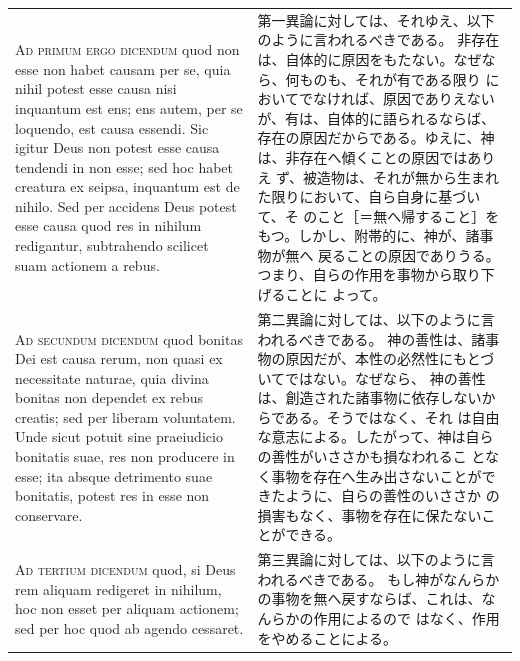 \documentclass[paper=a4paper,fontsize=10pt,jafontsize=9pt,titlepage]{jlreq}
\begin{document}
\begin{longtable}{p{21em}p{21em}}
\\


{\scshape Ad primum ergo dicendum} quod non esse non
habet causam per se, quia nihil potest esse causa nisi inquantum est
ens; ens autem, per se loquendo, est causa essendi. Sic igitur Deus non
potest esse causa tendendi in non esse; sed hoc habet creatura ex
seipsa, inquantum est de nihilo. Sed per accidens Deus potest esse causa
quod res in nihilum redigantur, subtrahendo scilicet suam actionem a
rebus.

&


第一異論に対しては、それゆえ、以下のように言われるべきである。
非存在は、自体的に原因をもたない。なぜなら、何ものも、それが有である限り
 においてでなければ、原因でありえないが、有は、自体的に語られるならば、
 存在の原因だからである。ゆえに、神は、非存在へ傾くことの原因ではありえ
 ず、被造物は、それが無から生まれた限りにおいて、自ら自身に基づいて、そ
 のこと［＝無へ帰すること］をもつ。しかし、附帯的に、神が、諸事物が無へ
 戻ることの原因でありうる。つまり、自らの作用を事物から取り下げることに
 よって。

\\


{\scshape Ad secundum dicendum} quod bonitas Dei est
causa rerum, non quasi ex necessitate naturae, quia divina bonitas non
dependet ex rebus creatis; sed per liberam voluntatem. Unde sicut potuit
sine praeiudicio bonitatis suae, res non producere in esse; ita absque
detrimento suae bonitatis, potest res in esse non conservare.

&

第二異論に対しては、以下のように言われるべきである。
神の善性は、諸事物の原因だが、本性の必然性にもとづいてではない。なぜなら、
 神の善性は、創造された諸事物に依存しないからである。そうではなく、それ
 は自由な意志による。したがって、神は自らの善性がいささかも損なわれるこ
 となく事物を存在へ生み出さないことができたように、自らの善性のいささか
 の損害もなく、事物を存在に保たないことができる。


\\


{\scshape Ad tertium dicendum} quod, si Deus rem
aliquam redigeret in nihilum, hoc non esset per aliquam actionem; sed
per hoc quod ab agendo cessaret.


&

第三異論に対しては、以下のように言われるべきである。
もし神がなんらかの事物を無へ戻すならば、これは、なんらかの作用によるので
 はなく、作用をやめることによる。

\end{longtable}
\newpage
\end{document}
